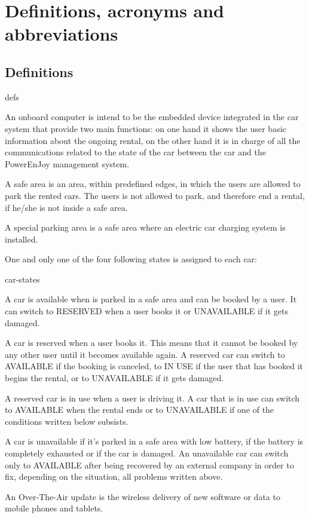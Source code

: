 \section{Definitions, acronyms and abbreviations}

\subsection{Definitions}
	\begin{labeling}{defs}
		\item[\textbf{Onboard computer}] An onboard computer is intend to be the embedded device integrated in the car system that provide two main functions: on one hand it shows the user basic information about the ongoing rental, on the other hand it is in charge of all the communications related to the state of the car between the car and the PowerEnJoy management system.
		\item[\textbf{Safe area}] A safe area is an area, within predefined edges, in which the users are allowed to park the rented cars. The users is not allowed to park, and therefore end a rental, if he/she is not inside a safe area.
		\item[\textbf{Special parking area}] A special parking area is a safe area where an electric car charging system is installed.
		\item[\textbf{Car states}] One and only one of the four following states is assigned to each car:
			\begin{labeling}{car-states}
				\item[\textbf{AVAILABLE}] A car is available when is parked in a safe area and can be booked by a user. It can switch to RESERVED when a user books it or UNAVAILABLE if it gets damaged.
				\item[\textbf{RESERVED}] A car is reserved when a user books it. This means that it cannot be booked by any other user until it becomes available again. A reserved car can switch to AVAILABLE if the booking is canceled, to IN USE if the user that has booked it begins the rental, or to UNAVAILABLE if it gets damaged.
				\item[\textbf{IN USE}] A reserved car is in use when a user is driving it. A car that is in use can switch to AVAILABLE when the rental ends or to UNAVAILABLE if one of the conditions written below subsists.
				\item[\textbf{UNAVAILABLE}] A car is unavailable if it's parked in a safe area with low battery, if the battery is completely exhausted or if the car is damaged. An unavailable car can switch only to AVAILABLE after being recovered by an external company in order to fix, depending on the situation, all problems written above.
			\end{labeling}
		\item[\textbf{Over-The-Air updates}] An Over-The-Air update is the wireless delivery of new software or data to mobile phones and tablets.
	\end{labeling}

